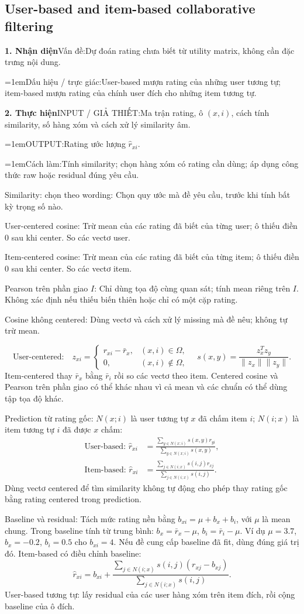 \documentclass[10pt,a4paper,twocolumn]{article}
\newif\ifexamheadingprinted
\newcommand{\topic}[2]{%
  \global\examheadingprintedfalse\par\subsection{#2}\label{topic:#1}}
\newcommand{\key}[1]{#1:\enspace}
\newcommand{\algfield}[2]{\par\noindent\hangindent=1em\relax#1:\enspace#2}
\newcommand{\unitfield}[4]{%
  \par\noindent\textbf{#1. #2}\enspace #3:\enspace #4}
\newcommand{\algsummary}[6]{%
  \begingroup\setlength{\parskip}{1pt}%
  \unitfield{1}{Nhận diện}{Vấn đề}{#1}%
  \algfield{Dấu hiệu / trực giác}{#2}%
  \if\relax\detokenize{#3}\relax\else\par\noindent#3\par\fi%
  \unitfield{2}{Thực hiện}{INPUT / GIẢ THIẾT}{#4}%
  \algfield{OUTPUT}{#5}%
  \algfield{Cách làm}{#6}\par\endgroup}
\begin{document}
\topic{cf}{User-based and item-based collaborative filtering}

\algsummary{Dự đoán rating chưa biết từ utility matrix, không cần đặc trưng nội dung.}{User-based mượn rating của những user tương tự; item-based mượn rating của chính user đích cho những item tương tự.}{}{Ma trận rating, ô $(x,i)$, cách tính similarity, số hàng xóm và cách xử lý similarity âm.}{Rating ước lượng $\hat r_{xi}$.}{Tính similarity; chọn hàng xóm có rating cần dùng; áp dụng công thức raw hoặc residual đúng yêu cầu.}

\key{Similarity: chọn theo wording} Chọn quy ước mà đề yêu cầu, trước khi tính bất kỳ trọng số nào.

\key{User-centered cosine} Trừ mean của các rating đã biết của từng user; ô thiếu điền 0 sau khi center. So các vectơ user.

\key{Item-centered cosine} Trừ mean của các rating đã biết của từng item; ô thiếu điền 0 sau khi center. So các vectơ item.

\key{Pearson trên phần giao $I$} Chỉ dùng tọa độ cùng quan sát; tính mean riêng trên $I$. Không xác định nếu thiếu biến thiên hoặc chỉ có một cặp rating.

\key{Cosine không centered} Dùng vectơ và cách xử lý missing mà đề nêu; không tự trừ mean.

\[
\text{User-centered:}\quad
z_{xi}=
\begin{cases}
r_{xi}-\bar r_x,&(x,i)\in\Omega,\\
0,&(x,i)\notin\Omega,
\end{cases}
\quad
s(x,y)=\frac{z_x^Tz_y}{\|z_x\|\|z_y\|}.
\]
Item-centered thay $\bar r_x$ bằng $\bar r_i$ rồi so các vectơ theo item. Centered cosine và Pearson trên phần giao có thể khác nhau vì cả mean và các chuẩn có thể dùng tập tọa độ khác.

\key{Prediction từ rating gốc} $N(x;i)$ là user tương tự $x$ đã chấm item $i$; $N(i;x)$ là item tương tự $i$ đã được $x$ chấm:
\begin{align*}
\text{User-based: }\hat r_{xi}
&=\frac{\sum_{y\in N(x;i)}s(x,y)r_{yi}}
{\sum_{y\in N(x;i)}s(x,y)},\\
\text{Item-based: }\hat r_{xi}
&=\frac{\sum_{j\in N(i;x)}s(i,j)r_{xj}}
{\sum_{j\in N(i;x)}s(i,j)}.
\end{align*}
Dùng vectơ centered để tìm similarity không tự động cho phép thay rating gốc bằng rating centered trong prediction.

\key{Baseline và residual} Tách mức rating nền bằng $b_{xi}=\mu+b_x+b_i$, với $\mu$ là mean chung. Trong baseline tính từ trung bình: $b_x=\bar r_x-\mu$, $b_i=\bar r_i-\mu$. Ví dụ $\mu=3.7$, $b_x=-0.2$, $b_i=0.5$ cho $b_{xi}=4$. Nếu đề cung cấp baseline đã fit, dùng đúng giá trị đó. Item-based có điều chỉnh baseline:
\[
\hat r_{xi}=b_{xi}+
\frac{\sum_{j\in N(i;x)}s(i,j)(r_{xj}-b_{xj})}
{\sum_{j\in N(i;x)}s(i,j)}.
\]
User-based tương tự: lấy residual của các user hàng xóm trên item đích, rồi cộng baseline của ô đích.
\end{document}
